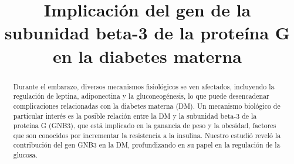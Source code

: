 \documentclass{bmcart}
\begin{document}
	\begin{frontmatter}
	
		\begin{fmbox}
			
			
			\title{Implicación del gen de la subunidad beta-3 de la proteína G en la diabetes materna}
			
			
			\author[
			  addressref={aff1},                   %
			  corref={aff1},                       %
			  email={victorgo@uma.es}   %
			]{ } %
			\author[
			  addressref={aff2},
			  email={susanafernandez@uma.es}
			]{ }
			\author[
			addressref={aff3},
			email={pablobermudezgamez@uma.es}
			]{ }
			\author[
			addressref={aff4},
			email={juancavergara6@uma.es}
			]{ }
			
			
			\address[id=aff1]{%
			  ,             %
			  ,          %
			  ,                              %
			}
		
		\end{fmbox}%
		
		\begin{abstractbox}
		
			\begin{abstract} %
			
			
			Durante el embarazo, diversos mecanismos fisiológicos se ven afectados, incluyendo la regulación de leptina, adiponectina y la gluconeogénesis, lo que puede desencadenar complicaciones relacionadas con la diabetes materna (DM). Un mecanismo biológico de particular interés es la posible relación entre la DM y la subunidad beta-3 de la proteína G (GNB3), que está implicado en la ganancia de peso y la obesidad, factores que son conocidos por incrementar la resistencia a la insulina. Nuestro estudió reveló la contribución del gen GNB3 en la DM, profundizando en su papel en la regulación de la glucosa.
			

\end{abstract}
\end{abstractbox}
\end{frontmatter}
\end{document}

